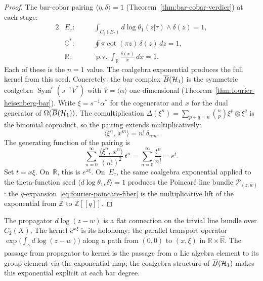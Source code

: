 \begin{proof}
The bar-cobar pairing
$\langle\eta,\delta\rangle = 1$
(Theorem~\ref{thm:bar-cobar-verdier}) at each stage:
\begin{alignat}{2}
&E_\tau\colon\quad
&&\textstyle\int_{\overline{C}_2(E_\tau)}\!
  d\log\theta_1(z|\tau) \wedge \delta(z) = 1,
\label{eq:pairing-Etau}
\\
&\mathbb{C}^*\colon\quad
&&\textstyle\oint \pi\cot(\pi z)\,\delta(z)\,dz = 1,
\label{eq:pairing-Gm}
\\
&\mathbb{R}\colon\quad
&&\textstyle\operatorname{p.v.}\!\int_{\mathbb{R}}
  \frac{\delta(x)}{x}\,dx = 1.
\label{eq:pairing-R}
\end{alignat}
Each of these is the $n = 1$ value.  The coalgebra exponential
produces the full kernel from this seed.  Concretely: the bar complex
$\overline{B}(\mathcal{H}_1)$ is the symmetric coalgebra
$\operatorname{Sym}^c(s^{-1}V^*)$ with $V = \langle\alpha\rangle$
one-dimensional
(Theorem~\ref{thm:fourier-heisenberg-bar}).  Write $\xi = s^{-1}\alpha^*$
for the cogenerator and $x$ for the dual generator of
$\Omega(\overline{B}(\mathcal{H}_1))$.
The comultiplication
$\Delta(\xi^n) = \sum_{p+q=n}\binom{n}{p}\xi^p \otimes \xi^q$
is the binomial coproduct, so the pairing extends multiplicatively:
\begin{equation}\label{eq:pairing-symmetric-powers}
\bigl\langle \xi^n,\, x^m\bigr\rangle
= n!\,\delta_{nm}.
\end{equation}
The generating function of the
pairing is
\begin{equation}\label{eq:pairing-exponential}
\sum_{n=0}^{\infty}
  \frac{\langle\xi^n,\, x^n\rangle}{(n!)^2}\,t^n
= \sum_{n=0}^{\infty}\frac{t^n}{n!}
= e^t.
\end{equation}
Set $t = x\xi$.  On~$\mathbb{R}$, this is $e^{x\xi}$.  On~$E_\tau$,
the same coalgebra exponential applied to the theta-function seed
$\langle d\log\theta_1, \delta\rangle = 1$ produces the Poincar\'e
line bundle $\mathcal{P}_{(z,\hat w)}$: the
$q$-expansion~\eqref{eq:fourier-poincare-fiber} is the multiplicative
lift of the exponential from $\mathbb{Z}$ to
$\mathbb{Z}[\![q]\!]$.
\end{proof}

\begin{remark}\label{rem:propagator-vs-kernel}
The propagator $d\log(z-w)$ is a flat connection on the trivial line
bundle over $C_2(X)$.  The kernel $e^{x\xi}$ is its holonomy: the
parallel transport operator $\exp\!\bigl(\int_\gamma d\log(z-w)\bigr)$
along a path from $(0,0)$ to $(x,\xi)$ in $\mathbb{R} \times
\widehat{\mathbb{R}}$.  The passage from propagator to kernel is the
passage from a Lie algebra element to its group element via the
exponential map; the coalgebra structure of $\overline{B}(\mathcal{H}_1)$
makes this exponential explicit at each bar degree.
\end{remark}


